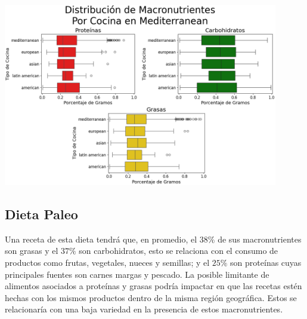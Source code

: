 \documentclass[12pt,a4paper]{article}
\begin{document}
{{{            \begin{center}
                \includegraphics[width=0.9\textwidth]{Resources/EDA/Mediterranean_2.png}
            \end{center}
            }

            \subsection{Dieta Paleo}\label{anexo:C_paleo}
            {
            Una receta de esta dieta tendrá que, en promedio, el $38\%$ de sus 
            macronutrientes son grasas y el $37\%$ son carbohidratos, esto se 
            relaciona con el consumo de productos como frutas, vegetales, nueces 
            y semillas; y el $25\%$ son proteínas cuyas principales fuentes son 
            carnes margas y pescado. La posible limitante de alimentos asociados 
            a proteínas	y grasas podría impactar en que las recetas estén hechas 
            con los mismos productos dentro de la misma región geográfica. Estos 
            se relacionaría con una baja variedad en la presencia de estos 
            macronutrientes.

}}}
\end{document}
